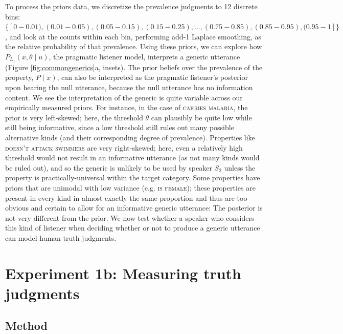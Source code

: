\documentclass[12pt,letterpaper]{article}
\begin{document}
To process the priors data, we discretize the prevalence judgments to 12 discrete bins: $\{[0-0.01), (0.01-0.05), (0.05-0.15), (0.15-0.25),  ..., (0.75-0.85), (0.85-0.95), (0.95-1]\}$, and look at the counts within each bin, performing add-1 Laplace smoothing, as the relative probability of that prevalence. 
Using these priors, we can explore how $P_{L_{1}}(x , \theta \mid u)$, the pragmatic listener model, interprets a generic utterance (Figure \ref{fig:commongenerics}a, insets). 
The prior beliefs over the prevalence of the property, $P(x)$, can also be interpreted as the pragmatic listener's posterior upon hearing the null utterance, because the null utterance has no information content.
We see the interpretation of the generic is quite variable across our empirically measured priors.
For instance, in the case of \textsc{carries malaria}, the prior is very left-skewed; here, the threshold $\theta$ can plausibly be quite low while still being informative, since a low threshold still rules out many possible alternative kinds (and their corresponding degree of prevalence).
Properties like \textsc{doesn't attack swimmers} are very right-skewed; here, even a relatively high threshold would not result in an informative utterance (as not many kinds would be ruled out), and so the generic is unlikely to be used by speaker $S_2$ unless the property is practically-universal within the target category. 
Some properties have priors that are unimodal with low variance (e.g. \textsc{is female}); these properties are present in every kind in almost exactly the same proportion and thus are too obvious and certain to allow for an informative generic utterance: The posterior is not very different from the prior. 
We now test whether a speaker who considers this kind of listener when deciding whether or not to produce a generic utterance can model human truth judgments.


\section*{Experiment 1b: Measuring truth judgments}



\subsection*{Method}
\end{document}
